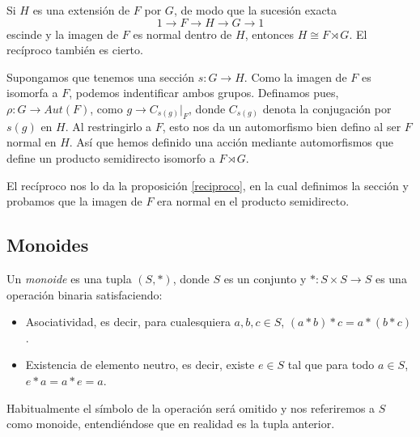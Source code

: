 \documentclass[TFG.tex]{subfiles}
\begin{document}
\begin{prop}\label{semidirect}
Si $H$ es una extensión de $F$ por $G$, de modo que la sucesión exacta 
\[
1\to F\to H\to G\to 1
\]
escinde y la imagen de $F$ es normal dentro de $H$, entonces $H\cong F\rtimes G$. El recíproco también es cierto. 
\end{prop}

\begin{dem}
Supongamos que tenemos una sección $s:G\to H$. Como la imagen de $F$ es isomorfa a $F$, podemos indentificar ambos grupos. Definamos pues, $\rho:G\to Aut(F)$, como $g\to C_{s(g)}|_F$, donde $C_{s(g)}$ denota la conjugación por $s(g)$ en $H$. Al restringirlo a $F$, esto nos da un automorfismo bien defino al ser $F$ normal en $H$. Así que hemos definido una acción mediante automorfismos que define un producto semidirecto isomorfo a $F\rtimes G$. 

El recíproco nos lo da la proposición \ref{reciproco}, en la cual definimos la sección y probamos que la imagen de $F$ era normal en el producto semidirecto.
\QED
\end{dem}
% 
%


\subsection{Monoides}

\begin{defi}
Un \emph{monoide} es una tupla $(S,*)$, donde $S$ es un conjunto y $*:S\times S\to S$ es una operación binaria satisfaciendo:
\begin{itemize}
\item Asociatividad, es decir, para cualesquiera $a,b,c\in S$, $(a*b)*c=a*(b*c)$.
\item Existencia de elemento neutro, es decir, existe $e\in S$ tal que para todo $a\in S$, $e*a=a*e=a$. 
\end{itemize}
Habitualmente el símbolo de la operación será omitido y nos referiremos a $S$ como monoide, entendiéndose que en realidad es la tupla anterior.
\end{defi}
\end{document}
